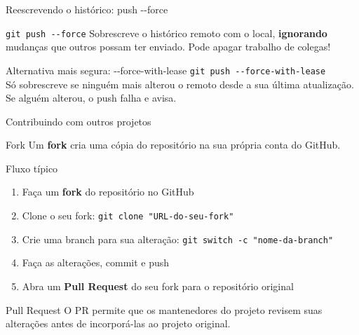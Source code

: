 \begin{frame}[fragile]{Reescrevendo o histórico: push -{}-force}
  \begin{block}{\texttt{git push -{}-force}}
    Sobrescreve o histórico remoto com o local, \textbf{ignorando} mudanças que outros possam ter enviado. Pode apagar trabalho de colegas!
  \end{block}
  \begin{alertblock}{Alternativa mais segura: -{}-force-with-lease}
    \texttt{git push -{}-force-with-lease}
    \vspace{0.2cm} \\
    Só sobrescreve se ninguém mais alterou o remoto desde a sua última atualização. Se alguém alterou, o push falha e avisa.
  \end{alertblock}
\end{frame}

\begin{frame}{Contribuindo com outros projetos}
  \begin{block}{Fork}
    Um \textbf{fork} cria uma cópia do repositório na sua própria conta do GitHub.
  \end{block}
  \begin{block}{Fluxo típico}
    \begin{enumerate}
      \item Faça um \textbf{fork} do repositório no GitHub
      \item Clone o seu fork:
            \texttt{git clone "URL-do-seu-fork"}
      \item Crie uma branch para sua alteração:
            \texttt{git switch -c "nome-da-branch"}
      \item Faça as alterações, commit e push
      \item Abra um \textbf{Pull Request} do seu fork para o repositório original
    \end{enumerate}
  \end{block}
  \begin{alertblock}{Pull Request}
    O PR permite que os mantenedores do projeto revisem suas alterações
    antes de incorporá-las ao projeto original.
  \end{alertblock}
\end{frame}